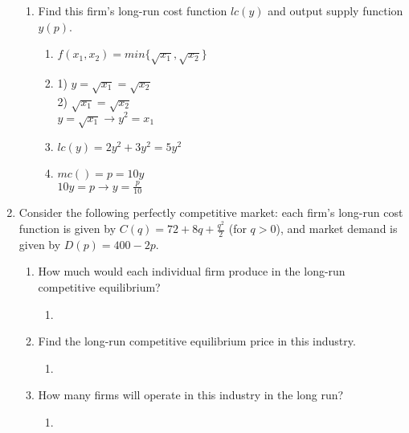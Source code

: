 \documentclass[11pt]{article}
\begin{document}
\begin{enumerate}
\begin{enumerate}
        \item Find this firm's long-run cost function $lc(y)$ and output supply function $y(p)$.
        \begin{enumerate}
            \item $f(x_1, x_2) = min\{\sqrt{x_1}, \sqrt{x_2}\}$
            \item 1) $y = \sqrt{x_1} = \sqrt{x_2}$\\
            2) $\sqrt{x_1} = \sqrt{x_2}$\\
            $y = \sqrt{x_1} \rightarrow y^2 = x_1$
            \item $lc(y) = 2y^2 + 3y^2 = 5y^2$
            \item $mc() = p = 10y$\\
            $10y = p \rightarrow y = \frac{p}{10}$
        \end{enumerate}

    \end{enumerate}
    
\pagebreak
\item Consider the following perfectly competitive market: each firm's long-run cost function is given by $C(q)=72+8q+\frac{q^{2}}{2}$ (for $q>0$), and market demand is given by $D(p)=400-2p$.
    \begin{enumerate}
    \item How much would each individual firm produce in the long-run competitive equilibrium?
    \begin{enumerate}
        \item 
    \end{enumerate}

    \item Find the long-run competitive equilibrium price in this industry.
    \begin{enumerate}
        \item 
    \end{enumerate}

    \item How many firms will operate in this industry in the long run?
    \begin{enumerate}
        \item 
    \end{enumerate}

    \end{enumerate}

\end{enumerate}
\end{document}
